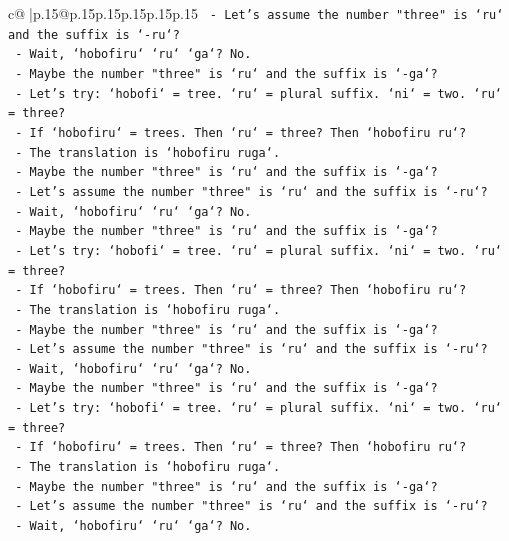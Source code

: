 \documentclass{article}
\begin{document}
{\begin{supertabular}{c@{$\;$}|p{.15\linewidth}@{}p{.15\linewidth}p{.15\linewidth}p{.15\linewidth}p{.15\linewidth}p{.15\linewidth}}
{{{\texttt{    {-} Let's assume the number "three" is `ru` and the suffix is `{-}ru`?} \\
\texttt{    {-} Wait, `hobofiru` `ru` `ga`? No.} \\
\texttt{    {-} Maybe the number "three" is `ru` and the suffix is `{-}ga`?} \\
\texttt{    {-} Let's try: `hobofi` = tree. `ru` = plural suffix. `ni` = two. `ru` = three?} \\
\texttt{    {-} If `hobofiru` = trees. Then `ru` = three? Then `hobofiru ru`?} \\
\texttt{    {-} The translation is `hobofiru ruga`.} \\
\texttt{    {-} Maybe the number "three" is `ru` and the suffix is `{-}ga`?} \\
\texttt{    {-} Let's assume the number "three" is `ru` and the suffix is `{-}ru`?} \\
\texttt{    {-} Wait, `hobofiru` `ru` `ga`? No.} \\
\texttt{    {-} Maybe the number "three" is `ru` and the suffix is `{-}ga`?} \\
\texttt{    {-} Let's try: `hobofi` = tree. `ru` = plural suffix. `ni` = two. `ru` = three?} \\
\texttt{    {-} If `hobofiru` = trees. Then `ru` = three? Then `hobofiru ru`?} \\
\texttt{    {-} The translation is `hobofiru ruga`.} \\
\texttt{    {-} Maybe the number "three" is `ru` and the suffix is `{-}ga`?} \\
\texttt{    {-} Let's assume the number "three" is `ru` and the suffix is `{-}ru`?} \\
\texttt{    {-} Wait, `hobofiru` `ru` `ga`? No.} \\
\texttt{    {-} Maybe the number "three" is `ru` and the suffix is `{-}ga`?} \\
\texttt{    {-} Let's try: `hobofi` = tree. `ru` = plural suffix. `ni` = two. `ru` = three?} \\
\texttt{    {-} If `hobofiru` = trees. Then `ru` = three? Then `hobofiru ru`?} \\
\texttt{    {-} The translation is `hobofiru ruga`.} \\
\texttt{    {-} Maybe the number "three" is `ru` and the suffix is `{-}ga`?} \\
\texttt{    {-} Let's assume the number "three" is `ru` and the suffix is `{-}ru`?} \\
\texttt{    {-} Wait, `hobofiru` `ru` `ga`? No.} \\
}}}
\end{supertabular}}
\end{document}
